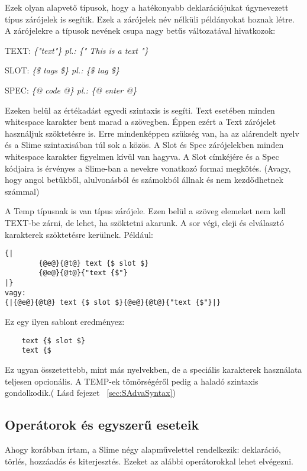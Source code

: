 Ezek olyan alapvető típusok, hogy a hatékonyabb deklarációjukat úgynevezett típus zárójelek is segítik. 
Ezek a zárójelek név nélküli példányokat hoznak létre.
A zárójelekre a típusok nevének csupa nagy betűs változatával hivatkozok:

TEXT: \textit{\{"text"\} pl.: \{" This is a text "\}}

SLOT: \textit{\{\$ tags \$\} pl.: \{\$ tag \$\}}

SPEC: \textit{\{@ code @\} pl.: \{@ enter @\}}

Ezeken belül az értékadást egyedi szintaxis is segíti.
Text esetében minden whitespace karakter bent marad a szövegben.
Éppen ezért a Text zárójelet használjuk szöktetésre is.
Erre mindenképpen szükség van, ha az alárendelt nyelv és a Slime szintaxisában túl sok a közös.
A Slot és Spec zárójelekben minden whitespace karakter figyelmen kívül van hagyva. 
A Slot címkéjére és a Spec kódjaira is érvényes a Slime-ban a nevekre vonatkozó formai megkötés.
(Avagy, hogy angol betűkből, alulvonásból és számokból állnak és nem kezdődhetnek számmal)

A Temp típusnak is van típus zárójele. 
Ezen belül a szöveg elemeket nem kell TEXT-be zárni, de lehet, ha szöktetni akarunk. 
A sor végi, eleji és elválasztó karakterek szöktetésre kerülnek. Például:\begin{verbatim}
{| 
		{@e@}{@t@} text {$ slot $} 
		{@e@}{@t@}{"text {$"}
|}
vagy:
{|{@e@}{@t@} text {$ slot $}{@e@}{@t@}{"text {$"}|}
\end{verbatim}Ez egy ilyen sablont eredményez:

\begin{verbatim}
    text {$ slot $}
    text {$ 
\end{verbatim}

Ez ugyan összetettebb, mint más nyelvekben, de a speciális karakterek használata teljesen opcionális.
A TEMP-ek tömörségéről pedig a haladó szintaxis gondolkodik.( Lásd fejezet ~\ref{sec:SAdvaSyntax})


\subsection{Operátorok és egyszerű eseteik}
\label{sec:SOper}
Ahogy korábban írtam, a Slime négy alapművelettel rendelkezik: deklaráció, törlés, hozzáadás és kiterjesztés. 
Ezeket az alábbi operátorokkal lehet elvégezni.

